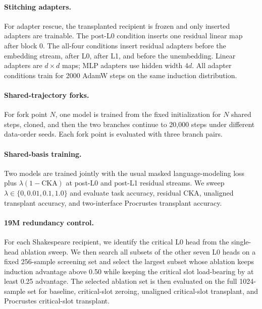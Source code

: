 \documentclass[final]{article}
\begin{document}
\paragraph{Stitching adapters.}
For adapter rescue, the transplanted recipient is frozen and only inserted
adapters are trainable. The post-L0 condition inserts one residual linear map
after block 0. The all-four conditions insert residual adapters before the
embedding stream, after L0, after L1, and before the unembedding. Linear
adapters are $d \times d$ maps; MLP adapters use hidden width $4d$. All adapter
conditions train for 2000 AdamW steps on the same induction distribution.

\paragraph{Shared-trajectory forks.}
For fork point $N$, one model is trained from the fixed initialization for
$N$ shared steps, cloned, and then the two branches continue to 20,000 steps
under different data-order seeds. Each fork point is evaluated with three
branch pairs.

\paragraph{Shared-basis training.}
Two models are trained jointly with the usual masked language-modeling loss
plus $\lambda(1-\mathrm{CKA})$ at post-L0 and post-L1 residual streams. We
sweep $\lambda \in \{0,0.01,0.1,1.0\}$ and evaluate task accuracy, residual
CKA, unaligned transplant accuracy, and two-interface Procrustes transplant
accuracy.

\paragraph{19M redundancy control.}
For each Shakespeare recipient, we identify the critical L0 head from the
single-head ablation sweep. We then search all subsets of the other seven L0
heads on a fixed 256-sample screening set and select the largest subset whose
ablation keeps induction advantage above 0.50 while keeping the critical slot
load-bearing by at least 0.25 advantage. The selected ablation set is then
evaluated on the full 1024-sample set for baseline, critical-slot zeroing,
unaligned critical-slot transplant, and Procrustes critical-slot transplant.
\end{document}
